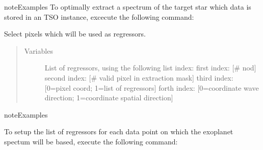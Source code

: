 \documentclass[a4paper,10pt,english]{sphinxmanual}
\begin{document}
\begin{fulllineitems}
\begin{fulllineitems}
\begin{sphinxadmonition}{note}{Examples}
To optimally extract a spectrum of the target star which data is stored
in an TSO instance, excecute the following command:

%
\begin{sphinxVerbatim}[commandchars=\\\{\}]
\end{sphinxVerbatim}
\end{sphinxadmonition}

\end{fulllineitems}


\begin{fulllineitems}
\label{\detokenize{cascade.TSO:cascade.TSO.TSO.TSOSuite.select_regressors}}
Select pixels which will be used as regressors.
\begin{quote}\begin{description}
\item[{Variables}] \leavevmode
{} \textendash{} List of regressors, using the following list index:
first index: {[}\# nod{]}
second index: {[}\# valid pixel in extraction mask{]}
third index: {[}0=pixel coord; 1=list of regressors{]}
forth index: {[}0=coordinate wave direction;
1=coordinate spatial direction{]}

\end{description}\end{quote}

\begin{sphinxadmonition}{note}{Examples}

To setup the list of regressors for each data point on which the
exoplanet spectum will be based, execute the following command:

%
\begin{sphinxVerbatim}[commandchars=\\\{\}]
\end{sphinxVerbatim}
\end{sphinxadmonition}


\end{fulllineitems}
\end{fulllineitems}
\end{document}
